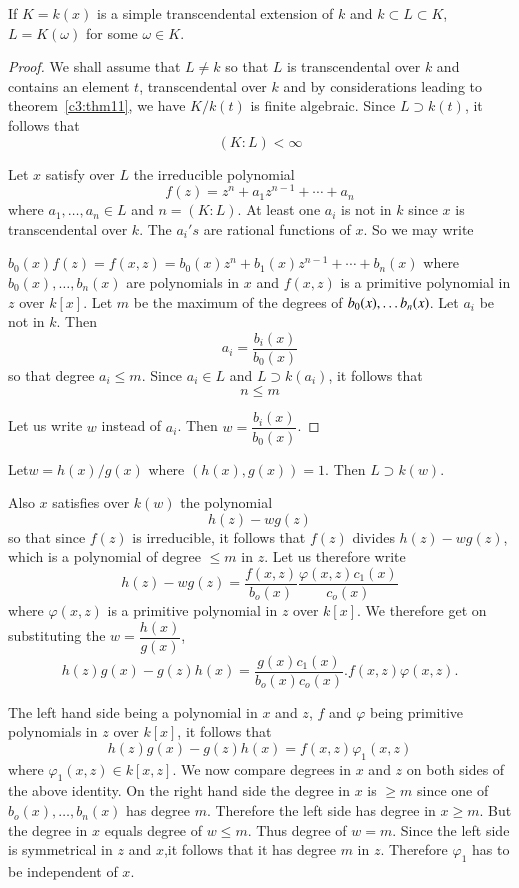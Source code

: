 \begin{thm}\label{c3:thm13}%
If $ K = k (x) $ is a simple transcendental extension of $k$  and
  $k \subset L \subset K $, $ L= K ( \omega ) $ for some $ \omega \in
  K $.  
\end{thm}

\begin{proof}
We shall assume that $ L \neq k $  so that $L$ is transcendental over
$k$ and contains an element $t$, transcendental over $k$ and by
considerations leading to theorem~\ref{c3:thm11}, we have $ K/k (t)
$ is finite algebraic. Since $ L \supset k (t) $, it follows that   
$$
( K : L ) < \infty 
$$

Let $x$ satisfy over $L$  the irreducible polynomial 
$$
f (z) = z^n + a_1 z^{n-1} + \cdots + a_n 
$$
where $ a_1 , \ldots , a_n \in L $ and $ n = ( K:L ) $. At least one $
a_i $ is not in $k$ since $x$ is transcendental over $k$. The $a_i's$
are rational functions of $x$. So we may write  


$ b_0 (x)  f(z)   =  f ( x,z )  = b_0 (x) z^n + b_1 (x) z^{n-1}+
\cdots + b_n (x) $ where \break $ b_0 (x), \ldots , b_n (x) $ are polynomials
in $x$ and $ f ( x, z ) $ is  a primitive polynomial in $z$ over $ k [
  x ] $. Let $ m $ be the maximum of the degrees of $ b_0 (x),\break \ldots
b_n (x) $. Let $a_i$ be not in $k$. Then 
$$
a_i = \frac{b_i(x)}{b_0(x)}
$$
so that degree $ a_i \leq m $. Since $ a_i \in L $ and $ L \supset k
(a_i) $, it follows that 
$$
n \leq m
$$

Let us write $w$ instead of $ a_i $. Then $ w = \dfrac{ b_i (x)}{b_0
  (x)} $. 
\end{proof}

Let\pageoriginale $w=h(x)/g(x)$ where $(h(x),g(x))=1$. Then $L \supset
k(w)$.  

Also $x$ satisfies over $k(w)$ the polynomial
$$
h(z) - w g(z)
$$
so that since $f(z)$ is irreducible, it follows that $f(z)$ divides
$h(z)- wg(z)$, which is a polynomial of degree $\leq m$ in $z$. Let us
therefore write  
$$
h(z)-wg(z)= \frac{f(x,z)}{b_o(x)} \frac{\varphi(x,z)c_1(x)}{c_o(x)} 
$$
where $\varphi(x,z)$ is a primitive polynomial in $z$ over $k[x]$. We
therefore get on substituting the $w= \dfrac{h(x)}{g(x)}$, 
$$
h(z)g(x)-g(z)h(x)= \frac{g(x)c_1(x)}{b_o(x)c_o(x)}. f(x,z)
\varphi(x,z). 
$$

The left hand side being a polynomial in $x$ and $z$, $f$ and $\varphi$
being primitive polynomials in $z$ over $k[x]$, it follows that  
$$
h(z)g(x)-g(z)h(x)= f(x,z) \varphi_1(x,z)
$$
where $\varphi_1(x,z) \in k[x,z]$. We now compare degrees in $x$ and
$z$ on both sides of the above identity. On the right hand side the
degree in $x$ is $\geq m$ since one of $b_o(x), \ldots,b_n(x)$ has
degree $m$. Therefore the left side has degree in $x \geq m$. But the
degree in $x$ equals degree of $w \leq m$. Thus degree of $w
=m$. Since the left side is symmetrical in $z$ and $x$,it follows that
it has degree $m$ in $z$. Therefore $\varphi_1$ has to be independent
of $x$. 

